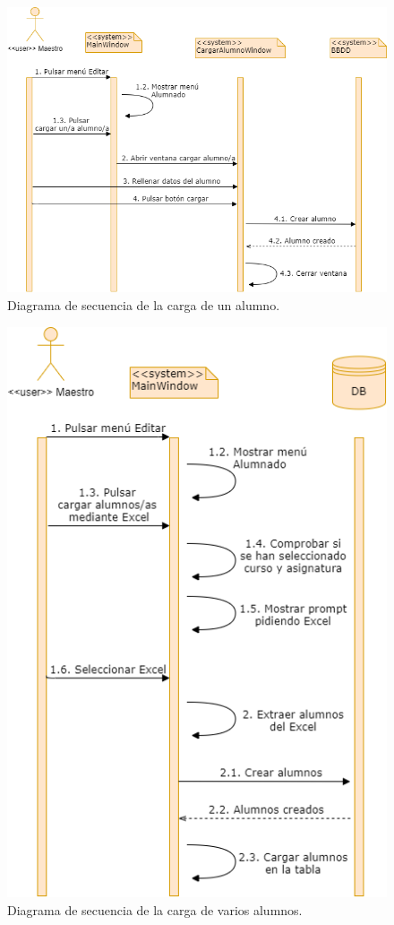 \begin{figure}[h]
\centering\includegraphics[width=1\linewidth]{figs/dia_cargaralumno.png}
\caption{Diagrama de secuencia de la carga de un alumno.}
\label{Fig:dia_cargaralumno}
\end{figure}

\begin{figure}[h]
\centering\includegraphics[width=0.5\linewidth]{figs/dia_cargaralumnos.png}
\caption{Diagrama de secuencia de la carga de varios alumnos.}
\label{Fig:dia_cargaralumnos}
\end{figure}